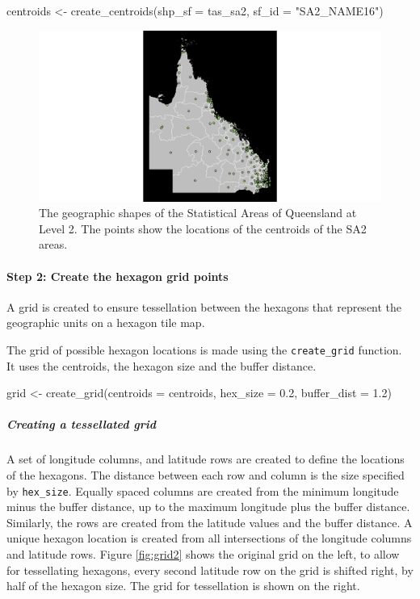 \begin{Schunk}
\begin{Sinput}
centroids <- create_centroids(shp_sf = tas_sa2, sf_id = "SA2_NAME16")
\end{Sinput}
\end{Schunk}

\begin{figure}[h]
\centering
\includegraphics[width=14cm]{figures/1centroids.pdf}
\caption{\label{fig:centroids_plot}The geographic shapes of the Statistical Areas of Queensland at Level 2. The points show the locations of the centroids of the SA2 areas.}
\end{figure}

\hypertarget{step-2-create-the-hexagon-grid-points}{%
\paragraph{Step 2: Create the hexagon grid
points}\label{step-2-create-the-hexagon-grid-points}}

A grid is created to ensure tessellation between the hexagons that
represent the geographic units on a hexagon tile map.

The grid of possible hexagon locations is made using the
\texttt{create\_grid} function. It uses the centroids, the hexagon size
and the buffer distance.

\begin{Schunk}
\begin{Sinput}
grid <- create_grid(centroids = centroids, hex_size = 0.2, buffer_dist = 1.2)
\end{Sinput}
\end{Schunk}

\hypertarget{creating-a-tessellated-grid}{%
\subparagraph{Creating a tessellated
grid}\label{creating-a-tessellated-grid}}

A set of longitude columns, and latitude rows are created to define the
locations of the hexagons. The distance between each row and column is
the size specified by \texttt{hex\_size}. Equally spaced columns are
created from the minimum longitude minus the buffer distance, up to the
maximum longitude plus the buffer distance. Similarly, the rows are
created from the latitude values and the buffer distance. A unique
hexagon location is created from all intersections of the longitude
columns and latitude rows. Figure \ref{fig:grid2} shows the original
grid on the left, to allow for tessellating hexagons, every second
latitude row on the grid is shifted right, by half of the hexagon size.
The grid for tessellation is shown on the right.

